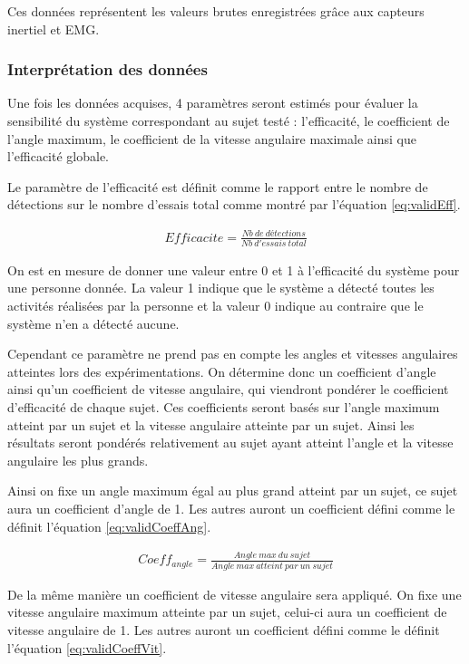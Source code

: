 \documentclass[letterpaper, twoside, 12pt, memoire, creativecommons, hyperref]{thETS}
\begin{document}
Ces données représentent les valeurs brutes enregistrées grâce aux capteurs inertiel et EMG. 

\subsubsection{Interprétation des données}

Une fois les données acquises, 4 paramètres seront estimés pour évaluer la sensibilité du système correspondant au sujet testé : l’efficacité, le coefficient de l’angle maximum, le coefficient de la vitesse angulaire maximale ainsi que l’efficacité globale.

Le paramètre de l’efficacité est définit comme le rapport entre le nombre de détections sur le nombre d’essais total comme montré par l'équation \ref{eq:validEff}.

\begin{align}\label{eq:validEff}
   Efficacite = \frac{Nb\ de\ détections}{Nb\ d'essais\ total} 
\end{align}

On est en mesure de donner une valeur entre 0 et 1 à l’efficacité du système pour une personne donnée. La valeur 1 indique que le système a détecté toutes les activités réalisées par la personne et la valeur 0 indique au contraire que le système n’en a détecté aucune. 

Cependant ce paramètre ne prend pas en compte les angles et vitesses angulaires atteintes lors des expérimentations. On détermine donc un coefficient d’angle ainsi qu’un coefficient de vitesse angulaire, qui viendront pondérer le coefficient d’efficacité de chaque sujet. Ces coefficients seront basés sur l’angle maximum atteint par un sujet et la vitesse angulaire atteinte par un sujet. Ainsi les résultats seront pondérés relativement au sujet ayant atteint l’angle et la vitesse angulaire les plus grands. 

Ainsi on fixe un angle maximum égal au plus grand atteint par un sujet, ce sujet aura un coefficient d’angle de 1. Les autres auront un coefficient défini comme le définit l'équation \ref{eq:validCoeffAng}. 

\begin{align}\label{eq:validCoeffAng}
   Coeff_{angle} = \frac{Angle\ max\ du\ sujet}{Angle\ max\ atteint\ par\ un\ sujet} 
\end{align}

De la même manière un coefficient de vitesse angulaire sera appliqué. On fixe une vitesse angulaire maximum atteinte par un sujet, celui-ci aura un coefficient de vitesse angulaire de 1. Les autres auront un coefficient défini comme le définit l'équation \ref{eq:validCoeffVit}.
\end{document}

